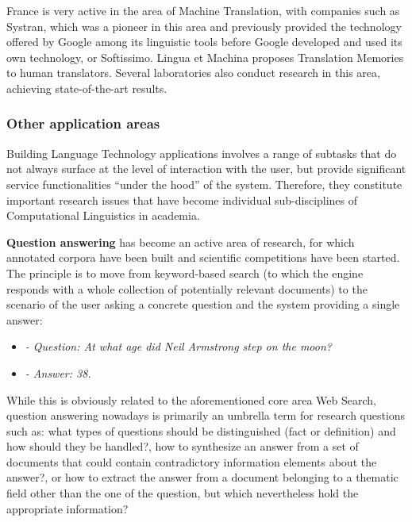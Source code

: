 \begin{multicols}{2}
France is very active in the area of Machine Translation, with
companies such as Systran, which was a pioneer in this area and
previously provided the technology offered by Google among its
linguistic tools before Google developed and used its own technology,
or Softissimo. Lingua et Machina proposes Translation Memories to
human translators. Several laboratories also conduct research in this
area, achieving state-of-the-art results.

\subsubsection{Other application areas}

Building Language Technology applications involves a range of subtasks
that do not always surface at the level of interaction with the user,
but provide significant service functionalities ``under the hood'' of
the system. Therefore, they constitute important research issues that
have become individual sub-disciplines of Computational Linguistics in
academia.

{\bf Question answering} has become an active area of research, for
which annotated corpora have been built and scientific competitions
have been started. The principle is to move from keyword-based search
(to which the engine responds with a whole collection of potentially
relevant documents) to the scenario of the user asking a concrete
question and the system providing a single answer:

\begin{itemize}
\item[] \textit{- Question: At what age did Neil Armstrong step on the moon?}
\item[] \textit{- Answer: 38.}
\end{itemize}

While this is obviously related to the aforementioned core area
Web Search, question answering nowadays is primarily an umbrella term
for research questions such as: what types of questions should be
distinguished (fact or definition) and how should they be handled?, how
to synthesize an answer from a set of documents that could contain
contradictory information elements about the answer?, or how to extract
the answer from a document belonging to a thematic field other than
the one of the question, but which nevertheless hold the appropriate
information?


\end{multicols}
